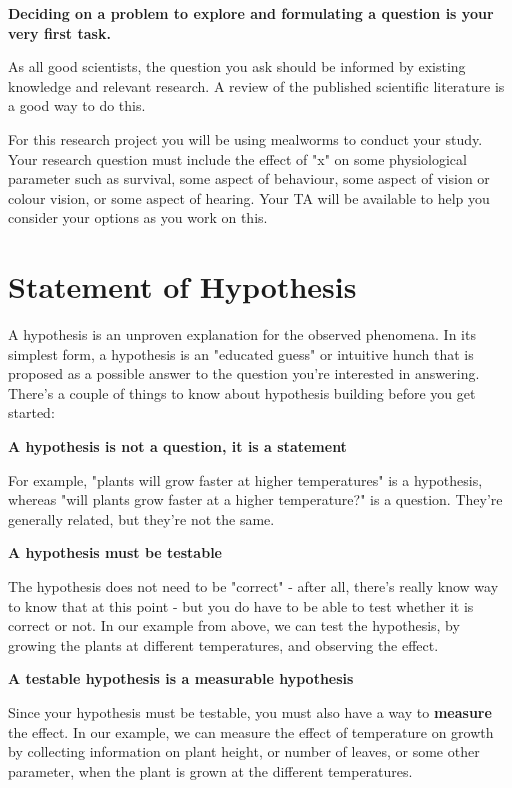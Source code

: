 \documentclass[
]{book}
\begin{document}
\textbf{Deciding on a problem to explore and formulating a question is your very first task.}

As all good scientists, the question you ask should be informed by existing knowledge and relevant research. A review of the published scientific literature is a good way to do this.

For this research project you will be using mealworms to conduct your study. Your research question must include the effect of "x" on some physiological parameter such as survival, some aspect of behaviour, some aspect of vision or colour vision, or some aspect of hearing. Your TA will be available to help you consider your options as you work on this.

\hypertarget{statement-of-hypothesis}{%
\section*{Statement of Hypothesis}\label{statement-of-hypothesis}}

A hypothesis is an unproven explanation for the observed phenomena. In its simplest form, a hypothesis is an "educated guess" or intuitive hunch that is proposed as a possible answer to the question you're interested in answering. There's a couple of things to know about hypothesis building before you get started:

\textbf{A hypothesis is not a question, it is a statement}

For example, "plants will grow faster at higher temperatures" is a hypothesis, whereas "will plants grow faster at a higher temperature?" is a question. They're generally related, but they're not the same.

\textbf{A hypothesis must be testable}

The hypothesis does not need to be "correct" - after all, there's really know way to know that at this point - but you do have to be able to test whether it is correct or not. In our example from above, we can test the hypothesis, by growing the plants at different temperatures, and observing the effect.

\textbf{A testable hypothesis is a measurable hypothesis}

Since your hypothesis must be testable, you must also have a way to \textbf{measure} the effect. In our example, we can measure the effect of temperature on growth by collecting information on plant height, or number of leaves, or some other parameter, when the plant is grown at the different temperatures.
\end{document}
